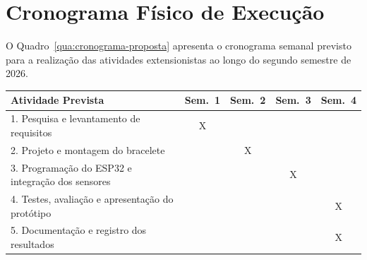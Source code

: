 \section{Cronograma Físico de Execução}
\label{sec:cronograma-fisico-proposta}

O Quadro~\ref{qua:cronograma-proposta} apresenta o cronograma semanal previsto para a realização das atividades extensionistas ao longo do segundo semestre de 2026.

\begin{quadro}[htb]
\centering
\caption{Cronograma de execução previsto para a proposta de extensão}
\label{qua:cronograma-proposta}
\small
\begin{tabular}{|p{7.5cm}|c|c|c|c|}
\hline
\textbf{Atividade Prevista} & \textbf{Sem.~1} & \textbf{Sem.~2} & \textbf{Sem.~3} & \textbf{Sem.~4} \\
\hline
1. Pesquisa e levantamento de requisitos & X & & & \\
\hline
2. Projeto e montagem do bracelete & & X & & \\
\hline
3. Programação do ESP32 e integração dos sensores & & & X & \\
\hline
4. Testes, avaliação e apresentação do protótipo & & & & X \\
\hline
5. Documentação e registro dos resultados & & & & X \\
\hline
\end{tabular}
\normalsize
{}
\end{quadro}
